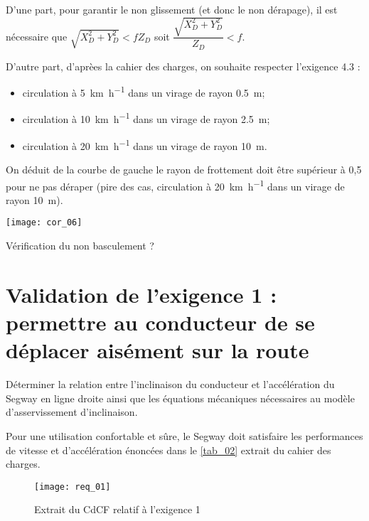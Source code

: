 \ifprof
\begin{corrige}
D'une part, pour garantir le non glissement (et donc le non dérapage), il est nécessaire que $\sqrt{X_D^2+Y_D^2} < f Z_D$ soit $\dfrac{\sqrt{X_D^2+Y_D^2}}{Z_D} < f $.

D'autre part, d'aprèes la cahier des charges, on souhaite respecter l'exigence 4.3 :
\begin{itemize} 
\item circulation à  \SI{5}{km.h^{-1}} dans un virage de rayon \SI{0,5}{m};
\item circulation à  \SI{10}{km.h^{-1}} dans un virage de rayon \SI{2,5}{m};
\item circulation à  \SI{20}{km.h^{-1}} dans un virage de rayon \SI{10}{m}.
\end{itemize}
On déduit de la courbe de gauche le rayon de frottement doit être supérieur à 0,5 pour ne pas déraper (pire des cas, circulation à   \SI{20}{km.h^{-1}} dans un virage de rayon \SI{10}{m}).


\begin{center}
\texttt{[image: cor\_06]}
\end{center}

Vérification du non basculement ?

\end{corrige}
\else
\fi

\section{Validation de l'exigence 1 : permettre au conducteur de se déplacer aisément sur la route}

\begin{obj}
Déterminer la relation entre l’inclinaison du conducteur et l’accélération du Segway en ligne droite ainsi que les équations mécaniques nécessaires au modèle d’asservissement d’inclinaison.
\end{obj}

\ifprof
\else

Pour une utilisation confortable et sûre, le Segway doit satisfaire les performances de vitesse et d’accélération énoncées dans le \autoref{tab_02} extrait du cahier des charges.


\begin{figure}[H]
\centering
\texttt{[image: req\_01]}
\caption{Extrait du CdCF relatif à l'exigence 1 \label{tab_02} }%
\end{figure}


